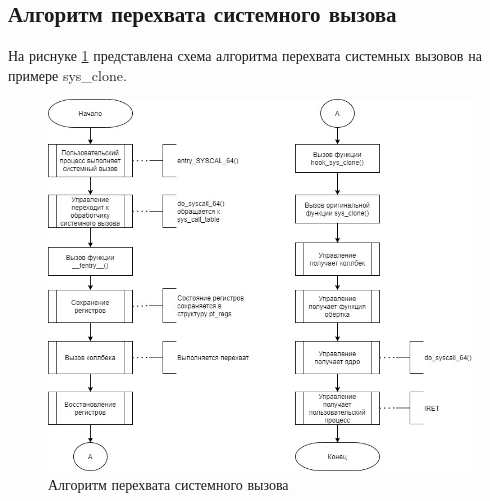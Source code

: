 \subsection{Алгоритм перехвата системного вызова}

На риснуке \ref{fig:ftrace_algo} представлена схема алгоритма перехвата системных вызовов на примере sys\_clone.

\begin{figure}[h]
	\begin{center}
		\includegraphics[scale=0.6]{jpg/ftrace_algo.jpg}
	\end{center}
	\caption{Алгоритм перехвата системного вызова}
	\label{fig:ftrace_algo}
\end{figure}

\newpage

